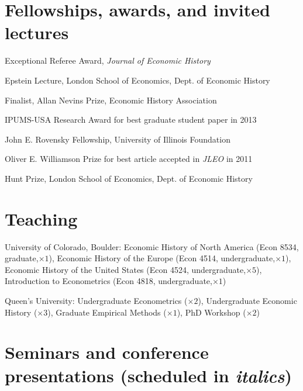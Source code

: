 \documentclass[11pt,letterpaper]{article}
\begin{document}
\section*{Fellowships, awards, and invited lectures}

\begin{description}[leftmargin=.75in,itemsep=.25em,itemindent=0in]
\item[2020]			Exceptional Referee Award, \emph{Journal of Economic History}
\item[2016]			Epstein Lecture, London School of Economics, Dept. of Economic History
\item[2014]			Finalist, Allan Nevins Prize, Economic History Association
\item[2014] 		IPUMS-USA Research Award for best graduate student paper in 2013
\item[2012 - 13] 	John E. Rovensky Fellowship, University of Illinois Foundation%
\item[2012] 		Oliver E. Williamson Prize for best article accepted in \emph{JLEO} in 2011
\item[2008] 	 	Hunt Prize, London School of Economics, Dept. of Economic History
\end{description}

\vspace{-1em}
\section*{Teaching}

\begin{description}[leftmargin=0in,itemsep=.25em,itemindent=0in]
\item 	University of Colorado, Boulder: Economic History of North America (Econ 8534, graduate,$\times 1$), Economic History of the Europe (Econ 4514, undergraduate,$\times 1$), Economic History of the United States (Econ 4524, undergraduate,$\times 5$), Introduction to Econometrics (Econ 4818, undergraduate,$\times 1$)

\item 	Queen's University: Undergraduate Econometrics ($\times 2$), Undergraduate Economic History ($\times 3$), Graduate Empirical Methods ($\times 1$), PhD Workshop ($\times 2$)
\end{description}

\vspace{-1em}
\section*{Seminars and conference presentations {\footnotesize\bf{(scheduled in \emph{italics})}}}
\end{document}
